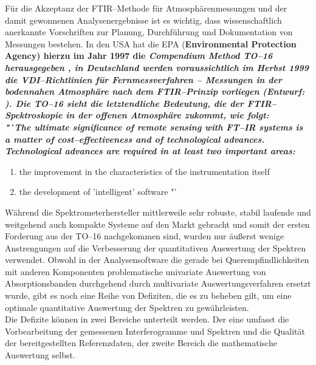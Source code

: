 F\"{u}r die Akzeptanz der FTIR--Methode f\"{u}r Atmosph\"{a}renmessungen und
der damit gewonnenen Analysenergebnisse ist es wichtig, dass
wissenschaftlich anerkannte Vorschriften zur Planung, Durchf\"{u}hrung
und Dokumentation von Messungen bestehen. In den USA hat die EPA
(\bf E\rm nvironmental \bf P\rm rotection \bf A\rm gency) hierzu
im Jahr 1997 die \it Compendium Method TO--16 \rm herausgegeben
\cite{to1697}, in Deutschland werden voraussichtlich im Herbst
1999 die VDI--Richtlinien f\"{u}r \it Fernmessverfahren -- Messungen
in der bodennahen Atmosph\"{a}re nach dem FTIR--Prinzip \rm vorliegen
(Entwurf: \cite{vdi98}). Die TO--16 sieht die letztendliche
Bedeutung, die der FTIR--Spektroskopie in der offenen Atmosph\"{a}re
zukommt, wie folgt:\\

\it "`The ultimate significance of remote sensing with FT--IR
systems is a matter of cost--effectiveness and of technological
advances. Technological advances are required in at least two
important areas:

\begin{enumerate}

\item the improvement in the characteristics of the
instrumentation itself

\item the development of 'intelligent' software "' \rm

\end{enumerate}

\rm W\"{a}hrend die Spektrometerhersteller mittlerweile sehr robuste,
stabil laufende und weitgehend auch kompakte Systeme auf den Markt
gebracht und somit der ersten Forderung aus der TO--16
nachgekommen sind, wurden nur \"{a}u{\ss}erst wenige Anstrengungen auf die
Verbesserung der quantitativen Auswertung der Spektren verwendet.
Obwohl in der Analysensoftware die gerade bei
Querempfindlichkeiten mit anderen Komponenten problematische
univariate Auswertung von Absorptionsbanden durchgehend durch
multivariate Auswertungsverfahren ersetzt wurde, gibt es noch eine
Reihe von Defiziten, die es zu beheben gilt, um eine optimale
quantitative Auswertung der Spektren zu gew\"{a}hrleisten.\\

Die Defizite k\"{o}nnen in zwei Bereiche unterteilt werden. Der eine
umfasst die Vorbearbeitung der gemessenen Interferogramme und
Spektren und die Qualit\"{a}t der bereitgestellten Referenzdaten, der
zweite Bereich die mathematische Auswertung selbst.\\

